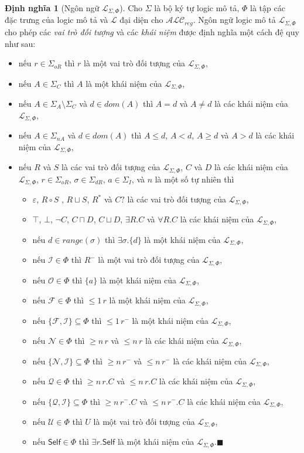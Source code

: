 \documentclass[12pt,a4paper,twoside]{report}
\newcommand{\mL}		{\mathcal{L}}
\newcommand{\mI}		{\mathcal{I}}
\newcommand{\mO}		{\mathcal{O}}
\newcommand{\mN}		{\mathcal{N}}
\newcommand{\mQ}		{\mathcal{Q}}
\newcommand{\mF}		{\mathcal{F}}
\newcommand{\mU}		{\mathcal{U}}
\newcommand{\SigmaI}	{\Sigma_I}
\newcommand{\SigmaA}	{\Sigma_A}
\newcommand{\SigmaC}	{\Sigma_C}
\newcommand{\SigmaNA}	{\Sigma_{nA}}
\newcommand{\SigmaOR}	{\Sigma_{oR}}
\newcommand{\SigmaDR}	{\Sigma_{dR}}
\newcommand{\Self}		{\mathsf{Self}}
\newcommand{\mLSP}		{\mL_{\Sigma,\Phi}}
\newcommand{\ALCreg}	{$\mathcal{ALC}_{reg}$\xspace}
\newcommand{\myend}		{\mbox{}\hfill\mbox{{\scriptsize$\!\blacksquare$}}}
\newcommand{\mand}		{\sqcap}
\newcommand{\mor}		{\sqcup}
\newcommand{\V}			{\forall}
\newcommand{\E}			{\exists}
\newcommand{\Dom}		{\mathit{dom}}
\newcommand{\Range}		{\mathit{range}}
\theoremstyle{definition}
\newtheorem{Definition}{Định nghĩa}[chapter]
\begin{document}
\begin{Definition}[Ngôn ngữ $\mLSP$]
\label{def:Language}
Cho $\Sigma$ là bộ ký tự logic mô tả, $\Phi$ là tập các đặc trưng của logic mô tả và $\mL$ đại diện cho \ALCreg. Ngôn ngữ logic mô tả $\mLSP$ cho phép các {\em vai trò đối tượng} và các {\em khái niệm} được định nghĩa một cách đệ quy như sau:
\begin{itemize}
\item nếu $r \in \SigmaOR$ thì $r$ là một vai trò đối tượng của $\mLSP$,
\item nếu $A \in \SigmaC$ thì $A$ là một khái niệm của $\mLSP$,
\item nếu $A \in \SigmaA\setminus\SigmaC$ và $d \in \Dom(A)$ thì $A=d$ và $A \neq d$ là các khái niệm của $\mLSP$,
\item nếu $A \in \SigmaNA$ và $d \in \Dom(A)$ thì $A \leq d$, $A < d$, $A \geq d$ và $A > d$ là các khái niệm của $\mLSP$,
\item nếu $R$ và $S$ là các vai trò đối tượng của $\mLSP$, $C$ và $D$ là các khái niệm của $\mLSP$, $r \in \SigmaOR$, $\sigma \in \SigmaDR$, $a \in \SigmaI$, và $n$ là một số tự nhiên thì
  \begin{itemize}
    \item $\varepsilon$, $R \circ S$ , $R \sqcup S$, $R^*$ và $C?$ là các vai trò đối tượng của $\mLSP$,
    \item $\top$, $\bot$, $\neg C$, $C \mand D$, $C \mor D$, $\E R.C$ và $\V R.C$ là các khái niệm của $\mLSP$,
    \item nếu $d \in \Range(\sigma)$ thì $\E \sigma.\{d\}$ là một khái niệm của $\mLSP$,
    \item nếu $\mI \in \Phi$ thì $R^-$ là một vai trò đối tượng của $\mLSP$,
    \item nếu $\mO \in \Phi$ thì $\{a\}$ là một khái niệm của $\mLSP$,
    \item nếu $\mF \in \Phi$ thì $\leq\!1\,r$ là một khái niệm của $\mLSP$,
    \item nếu $\{\mF, \mI\} \subseteq \Phi$ thì $\leq\!1\,r^-$ là một khái niệm của $\mLSP$,
    \item nếu $\mN \in \Phi$ thì $\geq n\,r$ và $\leq n\,r$ là các khái niệm của $\mLSP$,
    \item nếu $\{\mN, \mI\} \subseteq \Phi$ thì $\geq n\,r^-$ và $\leq n\,r^-$ là các khái niệm của $\mLSP$,
    \item nếu $\mQ \in \Phi$ thì $\geq n\,r.C$ và $\leq n\,r.C$ là các khái niệm của  $\mLSP$,
    \item nếu $\{\mQ, \mI\} \subseteq \Phi$ thì $\geq n\,r^-.C$ và $\leq n\,r^-.C$ là các khái niệm của $\mLSP$,
    \item nếu $\mU \in \Phi$ thì $U$ là một vai trò đối tượng của $\mLSP$,
    \item nếu $\Self \in \Phi$ thì $\E r.\Self$ là một khái niệm của $\mLSP$.\myend
  \end{itemize}
\end{itemize}
\end{Definition}
\end{document}
